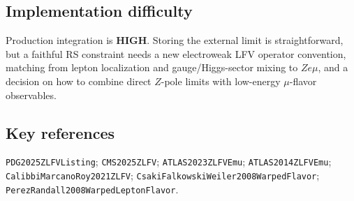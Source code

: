 \subsection*{Implementation difficulty}
Production integration is \textbf{HIGH}.  Storing the external limit is
straightforward, but a faithful RS constraint needs a new electroweak LFV
operator convention, matching from lepton localization and gauge/Higgs-sector
mixing to \(Z e\mu\), and a decision on how to combine direct \(Z\)-pole
limits with low-energy \(\mu\)-flavor observables.

\subsection*{Key references}
\texttt{PDG2025ZLFVListing}; \texttt{CMS2025ZLFV};
\texttt{ATLAS2023ZLFVEmu}; \texttt{ATLAS2014ZLFVEmu};
\texttt{CalibbiMarcanoRoy2021ZLFV};
\texttt{CsakiFalkowskiWeiler2008WarpedFlavor};
\texttt{PerezRandall2008WarpedLeptonFlavor}.
